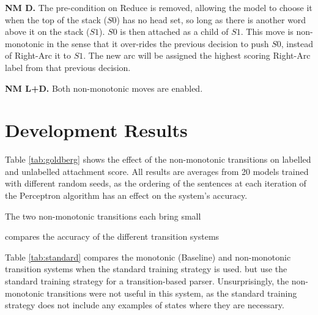 \documentclass[11pt,letterpaper]{article}
\begin{document}
\textbf{NM D.} The pre-condition on Reduce is removed, allowing the model to choose it
when the top of the stack ($S0$) has no head set, so long as there is another word
above it on the stack ($S1$). $S0$ is then attached as a child of $S1$. This move
is non-monotonic in the sense that it over-rides the previous decision to push $S0$,
instead of Right-Arc it to $S1$. The new arc will be assigned the highest scoring
Right-Arc label from that previous decision.

\textbf{NM L+D.} Both non-monotonic moves are enabled. 

\section{Development Results}
\label{sec:results}

Table \ref{tab:goldberg} shows the effect of the non-monotonic transitions on
labelled and unlabelled attachment score. All results are averages from 20 models
trained with different random seeds, as the ordering of the sentences at each iteration
of the Perceptron algorithm has an effect on the system's accuracy.

The two non-monotonic transitions each bring small 

compares the accuracy of the different transition systems

Table \ref{tab:standard} compares the monotonic (Baseline) and non-monotonic transition
systems when the standard training strategy is used.
but use the standard training strategy for a transition-based parser.
Unsurprisingly, the non-monotonic transitions
were not useful in this system, as the standard training strategy does not include
any examples of states where they are necessary.
\end{document}
